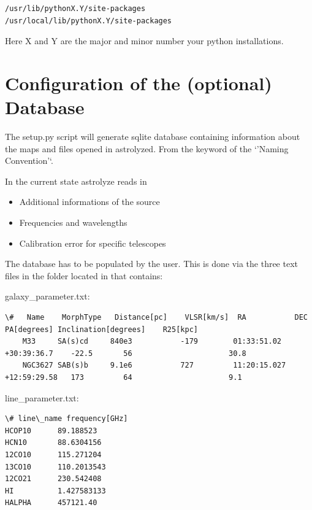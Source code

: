 \documentclass[a4paper,10pt,english]{sphinxmanual}
\begin{document}
\begin{Verbatim}[commandchars=\\\{\}]
/usr/lib/pythonX.Y/site-packages
/usr/local/lib/pythonX.Y/site-packages
\end{Verbatim}

Here X and Y are the major and minor number your python installations.


\section{Configuration of the (optional) Database}
\label{installation:configuration-of-the-optional-database}
The setup.py script will generate  sqlite database containing
information about the maps and files opened in astrolyzed. From the keyword of
the `'Naming Convention'`.

In the current state  astrolyze reads in
\begin{itemize}
\item {} 
Additional informations of the source

\item {} 
Frequencies and wavelengths

\item {} 
Calibration error for specific telescopes

\end{itemize}

The database has to be populated by the user. This is done via the three text
files in the  folder located in  that contains:

galaxy\_parameter.txt:

\begin{Verbatim}[commandchars=\\\{\}]
\#   Name    MorphType   Distance[pc]    VLSR[km/s]  RA           DEC            PA[degrees] Inclination[degrees]    R25[kpc] 
    M33     SA(s)cd     840e3           -179        01:33:51.02  +30:39:36.7    -22.5       56                      30.8
    NGC3627 SAB(s)b     9.1e6           727         11:20:15.027 +12:59:29.58   173         64                      9.1
\end{Verbatim}

line\_parameter.txt:

\begin{Verbatim}[commandchars=\\\{\}]
\# line\_name frequency[GHz]
HCOP10      89.188523 
HCN10       88.6304156
12CO10      115.271204
13CO10      110.2013543
12CO21      230.542408
HI          1.427583133
HALPHA      457121.40
\end{Verbatim}
\end{document}
